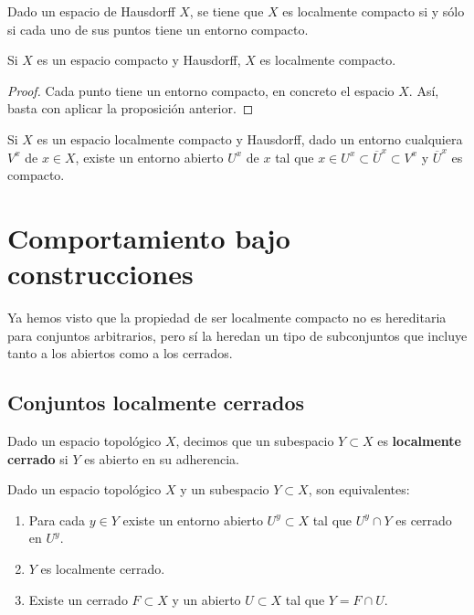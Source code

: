 \begin{colorary}
Dado un espacio de Hausdorff $\displaystyle X $, se tiene que $\displaystyle X $ es localmente compacto si y sólo si cada uno de sus puntos tiene un entorno compacto. 
\end{colorary}
\begin{colorary}
Si $\displaystyle X $ es un espacio compacto y Hausdorff, $\displaystyle X $ es localmente compacto. 
\end{colorary}
\begin{proof}
Cada punto tiene un entorno compacto, en concreto el espacio $\displaystyle X $. Así, basta con aplicar la proposición anterior.
\end{proof}
\begin{colorary}
Si $\displaystyle X $ es un espacio localmente compacto y Hausdorff, dado un entorno cualquiera $\displaystyle V^{x} $ de $\displaystyle x \in X $, existe un entorno abierto $\displaystyle U^{x} $ de $\displaystyle x $ tal que $\displaystyle x\in U^{x}\subset \overline{U}^{x}\subset V^{x} $ y $\displaystyle \overline{U}^{x} $ es compacto.
\end{colorary}
\section{Comportamiento bajo construcciones}
Ya hemos visto que la propiedad de ser localmente compacto no es hereditaria para conjuntos arbitrarios, pero sí la heredan un tipo de subconjuntos que incluye tanto a los abiertos como a los cerrados. 
\subsection{Conjuntos localmente cerrados}
\begin{definition}
Dado un espacio topológico $\displaystyle X $, decimos que un subespacio $\displaystyle Y\subset X $ es \textbf{localmente cerrado} si $\displaystyle Y $ es abierto en su adherencia.
\end{definition}
\begin{prop}
Dado un espacio topológico $\displaystyle X $ y un subespacio $\displaystyle Y \subset X$, son equivalentes:
\begin{enumerate}
\item Para cada $\displaystyle y \in Y $ existe un entorno abierto $\displaystyle U^{y}\subset X $ tal que $\displaystyle U^{y}\cap Y $ es cerrado en $\displaystyle U^{y} $. 
\item $\displaystyle Y $ es localmente cerrado.
\item Existe un cerrado $\displaystyle F \subset X $ y un abierto $\displaystyle U \subset X $ tal que $\displaystyle Y = F \cap U $.
\end{enumerate}
\end{prop}

